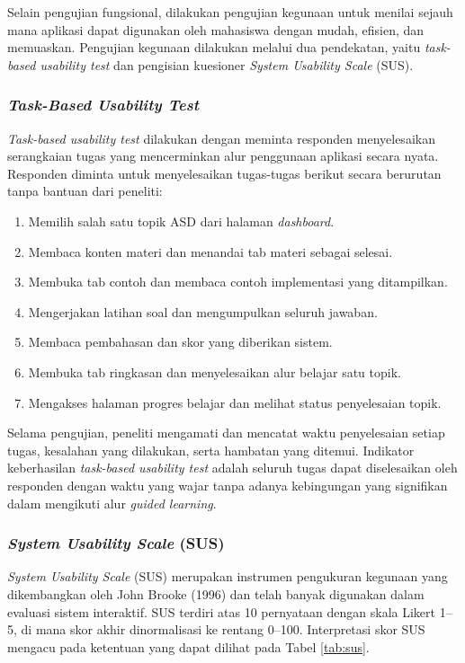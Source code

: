 Selain pengujian fungsional, dilakukan pengujian kegunaan untuk menilai sejauh mana aplikasi dapat digunakan oleh mahasiswa dengan mudah, efisien, dan memuaskan. Pengujian kegunaan dilakukan melalui dua pendekatan, yaitu \textit{task-based usability test} dan pengisian kuesioner \textit{System Usability Scale} (SUS).

\subsubsection{\textit{Task-Based Usability Test}}

\textit{Task-based usability test} dilakukan dengan meminta responden menyelesaikan serangkaian tugas yang mencerminkan alur penggunaan aplikasi secara nyata. Responden diminta untuk menyelesaikan tugas-tugas berikut secara berurutan tanpa bantuan dari peneliti:

\begin{enumerate}
    \item Memilih salah satu topik ASD dari halaman \textit{dashboard}.
    \item Membaca konten materi dan menandai tab materi sebagai selesai.
    \item Membuka tab contoh dan membaca contoh implementasi yang ditampilkan.
    \item Mengerjakan latihan soal dan mengumpulkan seluruh jawaban.
    \item Membaca pembahasan dan skor yang diberikan sistem.
    \item Membuka tab ringkasan dan menyelesaikan alur belajar satu topik.
    \item Mengakses halaman progres belajar dan melihat status penyelesaian topik.
\end{enumerate}

Selama pengujian, peneliti mengamati dan mencatat waktu penyelesaian setiap tugas, kesalahan yang dilakukan, serta hambatan yang ditemui. Indikator keberhasilan \textit{task-based usability test} adalah seluruh tugas dapat diselesaikan oleh responden dengan waktu yang wajar tanpa adanya kebingungan yang signifikan dalam mengikuti alur \textit{guided learning}.

\subsubsection{\textit{System Usability Scale} (SUS)}

\textit{System Usability Scale} (SUS) merupakan instrumen pengukuran kegunaan yang dikembangkan oleh John Brooke (1996) dan telah banyak digunakan dalam evaluasi sistem interaktif. SUS terdiri atas 10 pernyataan dengan skala Likert 1–5, di mana skor akhir dinormalisasi ke rentang 0–100. Interpretasi skor SUS mengacu pada ketentuan yang dapat dilihat pada Tabel \ref{tab:sus}.

